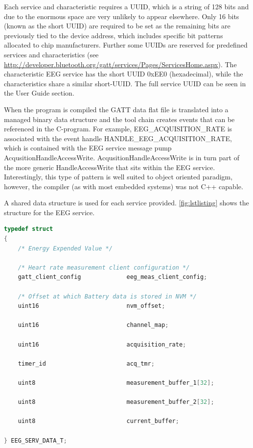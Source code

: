 \documentclass[]{article}
\begin{document}
Each service and characteristic requires a \ac{UUID}, which is a string of 128 bits and due to the enormous space are very unlikely to appear elsewhere. Only 16 bits (known as the short \ac{UUID}) are required to be set as the remaining bits are previously tied to the device address, which includes specific bit patterns allocated to chip manufacturers. Further some \ac{UUID}s are reserved for predefined services and characteristics (see \url{http://developer.bluetooth.org/gatt/services/Pages/ServicesHome.aspx}). The characteristic \ac{EEG} service has the short \ac{UUID} 0xEE0 (hexadecimal), while the characteristics share a similar short-UUID. The full service UUID can be seen in the User Guide section. 

When the program is compiled the GATT data flat file is translated into a managed binary data structure and the tool chain creates events that can be referenced in the C-program. For example, EEG\_ACQUISITION\_RATE is associated with the event handle HANDLE\_EEG\_ACQUISITION\_RATE, which is contained with the EEG service message pump AcqusitionHandleAccessWrite. AcqusitionHandleAccessWrite is in turn part of the more generic HandleAccessWrite that sits within the EEG service. Interestingly, this type of pattern is well suited to object oriented paradigm, however, the compiler (as with most embedded systems) was not C++ capable. 

A shared data structure is used for each service provided. \ref{fig:lstlisting} shows the structure for the \ac{EEG} service. 

\begin{lstlisting}[language=C, caption=\ac{EEG} data structure,label={lst:eegstruct}]
typedef struct
{
    /* Energy Expended Value */

    /* Heart rate measurement client configuration */
    gatt_client_config             eeg_meas_client_config; 

    /* Offset at which Battery data is stored in NVM */
    uint16                         nvm_offset;
    
    uint16                         channel_map; 
    
    uint16                         acquisition_rate;
    
    timer_id                       acq_tmr;
    
    uint8                          measurement_buffer_1[32];
   
    uint8                          measurement_buffer_2[32];
    
    uint8                          current_buffer;

} EEG_SERV_DATA_T;
\end{lstlisting}
\end{document}
